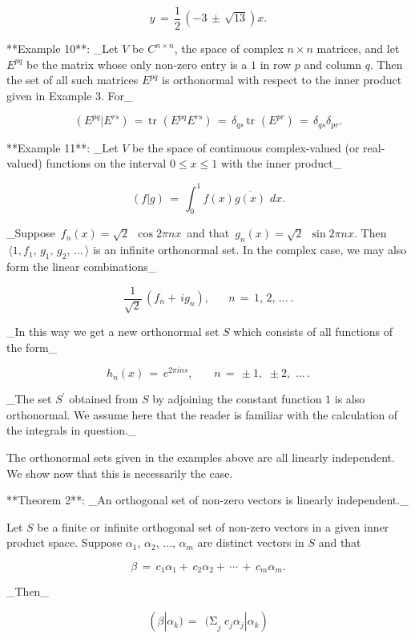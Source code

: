 \[y\,=\,\frac{1}{2}\,(-3\,\pm\,\sqrt{13})x.\]

**Example 10**: _Let \(V\) be \(C^{n\times n}\), the space of complex \(n\times n\) matrices, and let \(E^{pq}\) be the matrix whose only non-zero entry is a \(1\) in row \(p\) and column \(q\). Then the set of all such matrices \(E^{pq}\) is orthonormal with respect to the inner product given in Example 3. For_

\[(E^{pq}|E^{rs})\,=\,\mbox{tr}\,\,(E^{pq}E^{rs})\,=\,\delta_{qs}\,\mbox{tr}\,\,(E ^{pr})\,=\,\delta_{qs}\delta_{pr}.\]

**Example 11**: _Let \(V\) be the space of continuous complex-valued (or real-valued) functions on the interval \(0\leq x\leq 1\) with the inner product_

\[(f|g)\,=\,\int_{0}^{1}f(x)\overline{g(x)}\,\,dx.\]

_Suppose \(\,f_{n}(x)=\sqrt{2}\ \ \cos 2\pi nx\,\) and that \(\,g_{n}(x)=\sqrt{2}\ \ \sin 2\pi nx\). Then \(\,\langle 1,f_{1},\,g_{1},\,g_{2},\,\ldots\,\rangle\) is an infinite orthonormal set. In the complex case, we may also form the linear combinations_

\[\frac{1}{\sqrt{2}}\,(f_{n}+\,ig_{n}),\,\,\,\,\,\,\,\,\,\,n\,=\,1,\,2,\,\ldots\,.\]

_In this way we get a new orthonormal set \(S\) which consists of all functions of the form_

\[h_{n}(x)\,=\,e^{2\pi ins},\,\,\,\,\,\,\,\,\,\,\,n\,=\,\pm 1,\,\,\pm 2,\,\,\ldots\,.\]

_The set \(S^{\prime}\) obtained from \(S\) by adjoining the constant function \(1\) is also orthonormal. We assume here that the reader is familiar with the calculation of the integrals in question._

The orthonormal sets given in the examples above are all linearly independent. We show now that this is necessarily the case.

**Theorem 2**: _An orthogonal set of non-zero vectors is linearly independent._

Let \(S\) be a finite or infinite orthogonal set of non-zero vectors in a given inner product space. Suppose \(\alpha_{1}\), \(\alpha_{2}\), \(\ldots\), \(\alpha_{m}\) are distinct vectors in \(S\) and that

\[\beta\,=\,c_{1}\alpha_{1}+\,c_{2}\alpha_{2}+\,\cdots\,+\,c_{m}\alpha_{m}.\]

_Then_

\[(\beta|\alpha_{k})\,=\,\mathop{(\Sigma}_{j}c_{j}\alpha_{j}|\alpha_{k})\]

